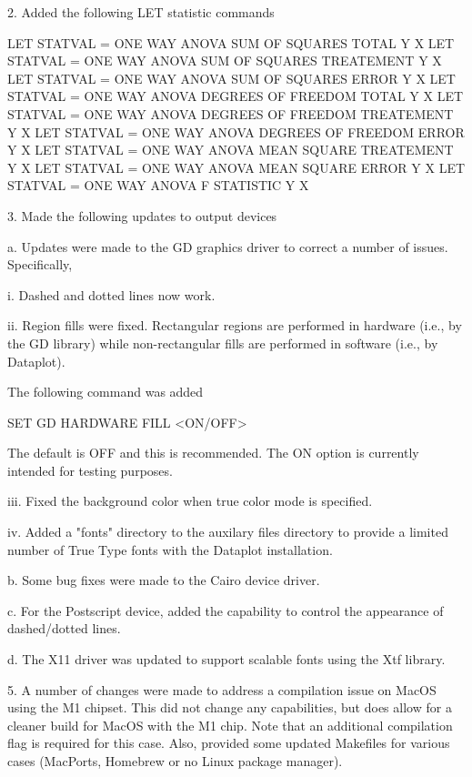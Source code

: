  2. Added the following LET statistic commands

        LET STATVAL = ONE WAY ANOVA SUM OF SQUARES TOTAL          Y X
        LET STATVAL = ONE WAY ANOVA SUM OF SQUARES TREATEMENT     Y X
        LET STATVAL = ONE WAY ANOVA SUM OF SQUARES ERROR          Y X
        LET STATVAL = ONE WAY ANOVA DEGREES OF FREEDOM TOTAL      Y X
        LET STATVAL = ONE WAY ANOVA DEGREES OF FREEDOM TREATEMENT Y X
        LET STATVAL = ONE WAY ANOVA DEGREES OF FREEDOM ERROR      Y X
        LET STATVAL = ONE WAY ANOVA MEAN SQUARE TREATEMENT        Y X
        LET STATVAL = ONE WAY ANOVA MEAN SQUARE ERROR             Y X
        LET STATVAL = ONE WAY ANOVA F STATISTIC                   Y X

 3. Made the following updates to output devices

    a. Updates were made to the GD graphics driver to correct a number
       of issues.  Specifically,

         i. Dashed and dotted lines now work.

        ii. Region fills were fixed.  Rectangular regions are performed
            in hardware (i.e., by the GD library) while non-rectangular
            fills are performed in software (i.e., by Dataplot).

            The following command was added

                SET GD HARDWARE FILL <ON/OFF>

            The default is OFF and this is recommended.  The ON
            option is currently intended for testing purposes.

       iii. Fixed the background color when true color mode is
            specified.

        iv. Added a "fonts" directory to the auxilary files
            directory to provide a limited number of True Type
            fonts with the Dataplot installation.

    b. Some bug fixes were made to the Cairo device driver.

    c. For the Postscript device, added the capability to
       control the appearance of dashed/dotted lines.

    d. The X11 driver was updated to support scalable fonts
       using the Xtf library.

 5. A number of changes were made to address a compilation issue
    on MacOS using the M1 chipset.  This did not change any
    capabilities, but does allow for a cleaner build for MacOS
    with the M1 chip.  Note that an additional compilation flag
    is required for this case.  Also, provided some updated
    Makefiles for various cases (MacPorts, Homebrew or no
    Linux package manager).

